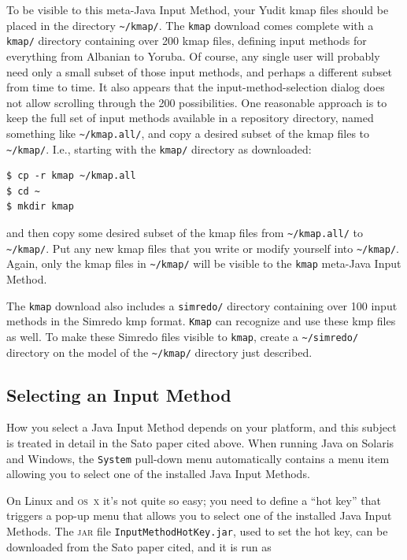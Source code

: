 \documentclass[letterpaper,12pt]{article}
\newcommand{\acro}{\textsc}
\begin{document}
To be visible to this meta-Java Input Method, your Yudit kmap files
should be placed in the directory \texttt{\~{}/kmap/}.  The
\texttt{kmap} download
comes complete with a \texttt{kmap/} directory containing over 200 kmap
files, defining input methods for everything from Albanian to Yoruba.  Of
course, any single user will probably need only a small subset of those
input methods, and perhaps a different subset from time to time.  It also
appears that the input-method-selection dialog does not allow scrolling
through the 200 possibilities.  One reasonable approach is to keep the
full set of input methods available in a repository directory, named
something like \texttt{\~{}/kmap.all/}, and copy a desired subset of the
kmap files  to \texttt{\~{}/kmap/}.  I.e., starting with the
\texttt{kmap/} directory as downloaded:

\begin{Verbatim}[fontsize=\small]
$ cp -r kmap ~/kmap.all
$ cd ~
$ mkdir kmap
\end{Verbatim}

\noindent
and then copy some desired subset of the kmap files from
\texttt{\~{}/kmap.all/} to \texttt{\~{}/kmap/}.  Put any new kmap
files that you write or modify yourself into \texttt{\~{}/kmap/}.  
Again, only the kmap
files in \texttt{\~{}/kmap/} will be visible to the \texttt{kmap} meta-Java Input
Method.

The \texttt{kmap} download also includes a \texttt{simredo/} directory containing
over 100 input methods in the Simredo kmp format.  \texttt{Kmap} can recognize and
use these kmp files as well.  To make these Simredo files visible to
\texttt{kmap}, create a \texttt{\~{}/simredo/} directory on the model of the
\texttt{\~{}/kmap/} directory just described.

\subsection{Selecting an Input Method}

How you select a Java Input Method depends on your platform, and this
subject is treated in detail in the Sato paper cited above.  When running
Java on Solaris and Windows, the \texttt{System} pull-down menu
automatically contains a menu item allowing you to select one of the
installed Java Input Methods.

On Linux and \acro{os~x} it's not quite so easy; 
you need to define a ``hot key'' that triggers a
pop-up menu that allows you to select one of the installed Java Input
Methods.  The \acro{jar} file \texttt{InputMethodHotKey.jar}, used
to set the hot key, can be
downloaded from the Sato paper cited, and it is run as
\end{document}
